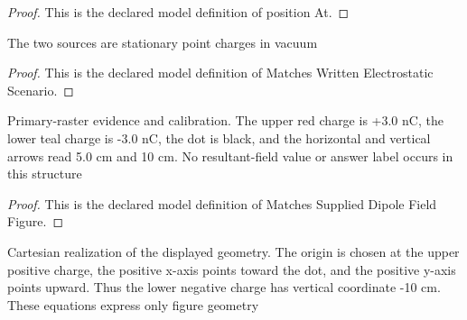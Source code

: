 \begin{proof}
  This is the declared model definition of position At.
\end{proof}
\begin{definition}
  \label{def:physics:phyx-mini-0915:phyxminiproblems-problemphyxmini0915-matcheswrittenelectrostaticscenario}
  The two sources are stationary point charges in vacuum
\end{definition}
\begin{proof}
  This is the declared model definition of Matches Written Electrostatic Scenario.
\end{proof}
\begin{definition}
  \label{def:physics:phyx-mini-0915:phyxminiproblems-problemphyxmini0915-matchessupplieddipolefieldfigure}
  Primary-raster evidence and calibration. The upper red charge is +3.0 nC, the lower teal charge is -3.0 nC, the dot is black, and the horizontal and vertical arrows read 5.0 cm and 10 cm. No resultant-field value or answer label occurs in this structure
\end{definition}
\begin{proof}
  This is the declared model definition of Matches Supplied Dipole Field Figure.
\end{proof}
\begin{definition}
  \label{def:physics:phyx-mini-0915:phyxminiproblems-problemphyxmini0915-usesdisplayedrightanglegeometry}
  Cartesian realization of the displayed geometry. The origin is chosen at the upper positive charge, the positive x-axis points toward the dot, and the positive y-axis points upward. Thus the lower negative charge has vertical coordinate -10 cm. These equations express only figure geometry
\end{definition}

